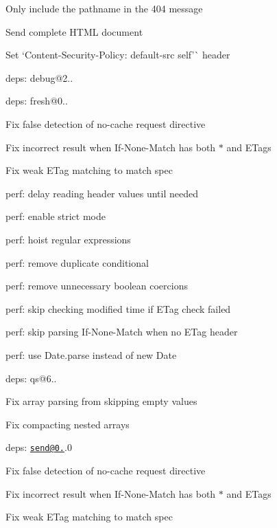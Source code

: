 \begin{DoxyItemize}
\begin{DoxyItemize}
\item Only include the pathname in the 404 message
\item Send complete H\+T\+ML document
\item Set `Content-\/\+Security-\/\+Policy\+: default-\/src \textquotesingle{}self'\`{} header
\item deps\+: debug@2..
\end{DoxyItemize}
\item deps\+: fresh@0..
\begin{DoxyItemize}
\item Fix false detection of {\ttfamily no-\/cache} request directive
\item Fix incorrect result when {\ttfamily If-\/\+None-\/\+Match} has both {\ttfamily $\ast$} and E\+Tags
\item Fix weak {\ttfamily E\+Tag} matching to match spec
\item perf\+: delay reading header values until needed
\item perf\+: enable strict mode
\item perf\+: hoist regular expressions
\item perf\+: remove duplicate conditional
\item perf\+: remove unnecessary boolean coercions
\item perf\+: skip checking modified time if E\+Tag check failed
\item perf\+: skip parsing {\ttfamily If-\/\+None-\/\+Match} when no {\ttfamily E\+Tag} header
\item perf\+: use {\ttfamily Date.\+parse} instead of {\ttfamily new Date}
\end{DoxyItemize}
\item deps\+: qs@6..
\begin{DoxyItemize}
\item Fix array parsing from skipping empty values
\item Fix compacting nested arrays
\end{DoxyItemize}
\item deps\+: \href{mailto:send@0.15}{\tt send@0.}.0
\begin{DoxyItemize}
\item Fix false detection of {\ttfamily no-\/cache} request directive
\item Fix incorrect result when {\ttfamily If-\/\+None-\/\+Match} has both {\ttfamily $\ast$} and E\+Tags
\item Fix weak {\ttfamily E\+Tag} matching to match spec

\end{DoxyItemize}
\end{DoxyItemize}
